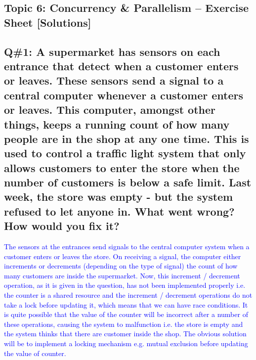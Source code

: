 \subsection{Topic 6: Concurrency \& Parallelism – Exercise Sheet [Solutions]}
\subsection*{Q\#1: A supermarket has sensors on each entrance that detect when a customer enters or leaves. These
sensors send a signal to a central computer whenever a customer enters or leaves. This computer,
amongst other things, keeps a running count of how many people are in the shop at any one time. This
is used to control a traffic light system that only allows customers to enter the store when the number of
customers is below a safe limit. Last week, the store was empty - but the system refused to let anyone
in. What went wrong? How would you fix it?} 
\textcolor{blue}{
The sensors at the entrances send signals to the central computer system when a customer enters or
leaves the store. On receiving a signal, the computer either increments or decrements (depending on the
type of signal) the count of how many customers are inside the supermarket. Now, this increment /
decrement operation, as it is given in the question, has not been implemented properly i.e. the counter
is a shared resource and the increment / decrement operations do not take a lock before updating it,
which means that we can have race conditions. It is quite possible that the value of the counter will be
incorrect after a number of these operations, causing the system to malfunction i.e. the store is empty
and the system thinks that there are customer inside the shop.
The obvious solution will be to implement a locking mechanism e.g. mutual exclusion before updating
the value of counter. 
}
